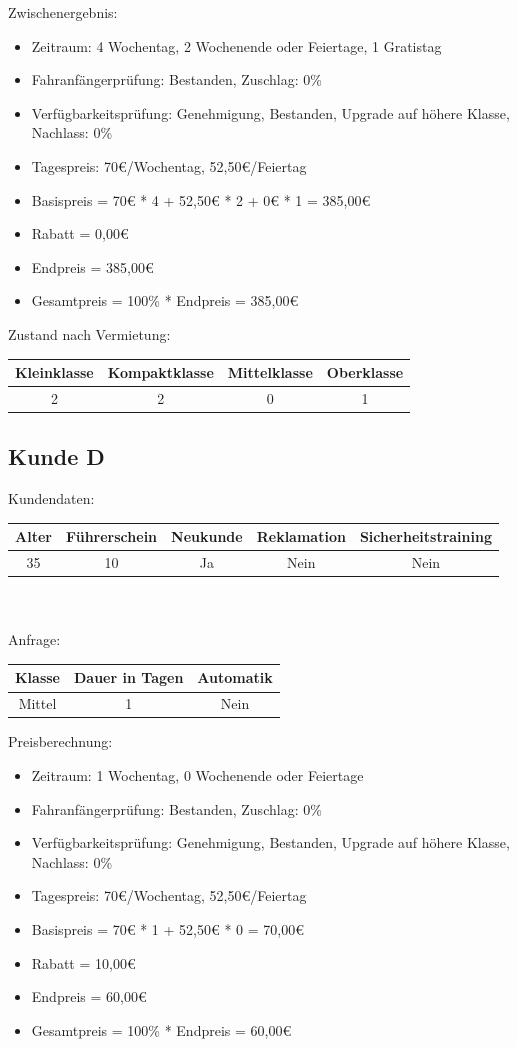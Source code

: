 Zwischenergebnis:
\begin{itemize}
	\item Zeitraum: 4 Wochentag, 2 Wochenende oder Feiertage, 1 Gratistag
	\item Fahranfängerprüfung: Bestanden, Zuschlag: 0\%
	\item Verfügbarkeitsprüfung: Genehmigung, Bestanden, Upgrade auf höhere Klasse, Nachlass: 0\%
	\item Tagespreis: 70€/Wochentag, 52,50€/Feiertag
	\item Basispreis = 70€ * 4 + 52,50€ * 2 + 0€ * 1 = 385,00€
	\item Rabatt = 0,00€
	\item Endpreis = 385,00€
	\item Gesamtpreis = 100\% * Endpreis = 385,00€
\end{itemize}

Zustand nach Vermietung:\\
\begin{tabular}{|c|c|c|c|}
	\hline \textbf{Kleinklasse} & \textbf{Kompaktklasse} & \textbf{Mittelklasse} & \textbf{Oberklasse}  \\ 
	\hline 2 & 2 & 0 & 1 \\ 
	\hline 
\end{tabular} 

\subsection{Kunde D}

Kundendaten:\\
\begin{tabular}{|c|c|c|c|c|}
	\hline \textbf{Alter} & \textbf{Führerschein} & \textbf{Neukunde} & \textbf{Reklamation} & \textbf{Sicherheitstraining} \\ 
	\hline 35 & 10 & Ja & Nein & Nein \\ 
	\hline 
\end{tabular} 
\\\\
Anfrage:\\
\begin{tabular}{|c|c|c|}
	\hline \textbf{Klasse} & \textbf{Dauer in Tagen} & \textbf{Automatik} \\ 
	\hline Mittel & 1 & Nein \\ 
	\hline 
\end{tabular}

Preisberechnung:
\begin{itemize}
	\item Zeitraum: 1 Wochentag, 0 Wochenende oder Feiertage
	\item Fahranfängerprüfung: Bestanden, Zuschlag: 0\%
	\item Verfügbarkeitsprüfung: Genehmigung, Bestanden, Upgrade auf höhere Klasse, Nachlass: 0\%
	\item Tagespreis: 70€/Wochentag, 52,50€/Feiertag
	\item Basispreis = 70€ * 1 + 52,50€ * 0 = 70,00€
	\item Rabatt = 10,00€
	\item Endpreis = 60,00€
	\item Gesamtpreis = 100\% * Endpreis = 60,00€
\end{itemize}

